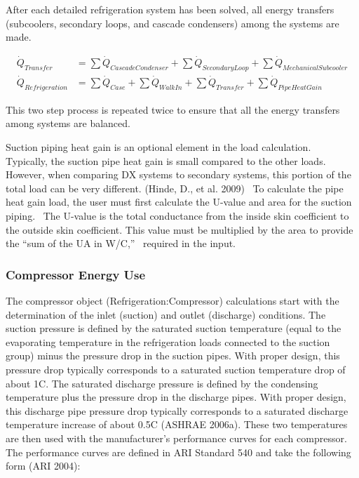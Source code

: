 After each detailed refrigeration system has been solved, all energy transfers (subcoolers, secondary loops, and cascade condensers) among the systems are made.

\begin{equation}
  \begin{array}{rl}
    \dot{Q}_{Transfer} &= \sum \dot{Q}_{CascadeCondenser} + \sum \dot{Q}_{SecondaryLoop} + \sum \dot{Q}_{MechanicalSubcooler} \\
    \dot{Q}_{Refrigeration} &= \sum \dot{Q}_{Case} + \sum \dot{Q}_{WalkIn} + \sum \dot{Q}_{Transfer} + \sum \dot{Q}_{PipeHeatGain}
  \end{array}
\end{equation}

This two step process is repeated twice to ensure that all the energy transfers among systems are balanced.

Suction piping heat gain is an optional element in the load calculation.~ Typically, the suction pipe heat gain is small compared to the other loads.~ However, when comparing DX systems to secondary systems, this portion of the total load can be very different. (Hinde, D., et al. 2009) ~To calculate the pipe heat gain load, the user must first calculate the U-value and area for the suction piping.~ The U-value is the total conductance from the inside skin coefficient to the outside skin coefficient. This value must be multiplied by the area to provide the ``sum of the UA in W/C,''~ required in the input.

\subsubsection{Compressor Energy Use}\label{compressor-energy-use-1}

The compressor object (Refrigeration:Compressor) calculations start with the determination of the inlet (suction) and outlet (discharge) conditions. The suction pressure is defined by the saturated suction temperature (equal to the evaporating temperature in the refrigeration loads connected to the suction group) minus the pressure drop in the suction pipes. With proper design, this pressure drop typically corresponds to a saturated suction temperature drop of about 1C. The saturated discharge pressure is defined by the condensing temperature plus the pressure drop in the discharge pipes. With proper design, this discharge pipe pressure drop typically corresponds to a saturated discharge temperature increase of about 0.5C (ASHRAE 2006a). These two temperatures are then used with the manufacturer's performance curves for each compressor. The performance curves are defined in ARI Standard 540 and take the following form (ARI 2004):

